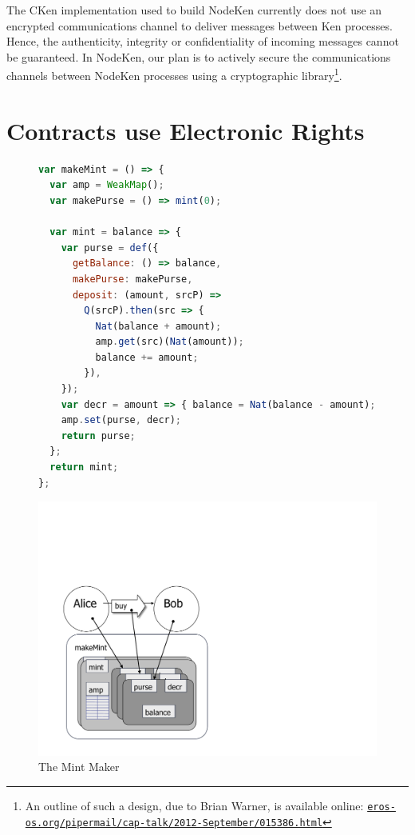 \documentclass{llncs}
\newcommand{\myurl}[1]{{\href{http://#1}{\texttt{#1}}}}
\begin{document}
The CKen implementation used to build NodeKen currently does not use an encrypted communications channel to deliver messages between Ken processes. Hence, the authenticity, integrity or confidentiality of incoming messages cannot be guaranteed. In NodeKen, our plan is to actively secure the communications channels between NodeKen processes using a cryptographic library\footnote{
%
An outline of such a design, due to Brian Warner, is available online: \myurl{eros-os.org/pipermail/cap-talk/2012-September/015386.html}}.

\section{Contracts use Electronic Rights}

\begin{figure}[t]
\begin{minipage}[t]{0.48\linewidth}
\begin{lstlisting}[language=javascript]
var makeMint = () => {
  var amp = WeakMap();
  var makePurse = () => mint(0);
  
  var mint = balance => {
    var purse = def({
      getBalance: () => balance,
      makePurse: makePurse,
      deposit: (amount, srcP) =>
        Q(srcP).then(src => {
          Nat(balance + amount);
          amp.get(src)(Nat(amount)); 
          balance += amount;
        }),
    });
    var decr = amount => { balance = Nat(balance - amount); };
    amp.set(purse, decr);
    return purse;
  };
  return mint;
};
\end{lstlisting}
\end{minipage}
\begin{minipage}[t]{0.48\linewidth}
\vspace{0pt}
\includegraphics[scale=0.3]{bw-mint.pdf}
\end{minipage}
\caption{The Mint Maker}
\label{makeMint}
\end{figure}
\end{document}
